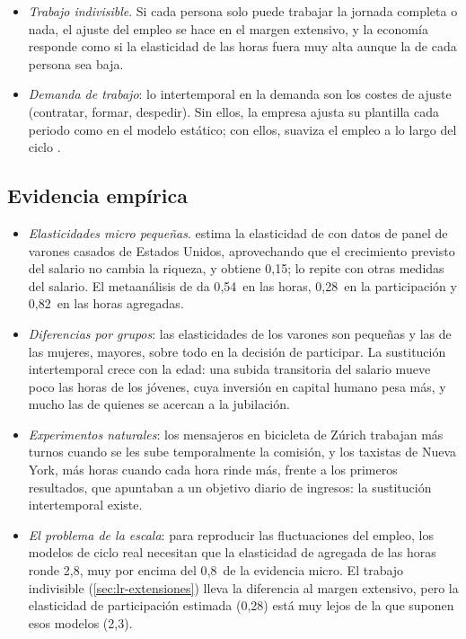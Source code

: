 \documentclass[11pt]{article}
\begin{document}
\begin{itemize}
\begin{itemize}
  \end{itemize}
\item \emph{Trabajo indivisible}. Si cada persona solo puede trabajar la jornada completa o nada, el ajuste del empleo se hace en el margen extensivo, y la economía responde como si la elasticidad de las horas fuera muy alta aunque la de cada persona sea baja\nocite{Hansen1985Indivisible,Rogerson1988Indivisible}.
\item \emph{Demanda de trabajo}: lo intertemporal en la demanda son los costes de ajuste (contratar, formar, despedir). Sin ellos, la empresa ajusta su plantilla cada periodo como en el modelo estático; con ellos, suaviza el empleo a lo largo del ciclo .
\end{itemize}

\subsection{Evidencia empírica}\label{sec:lr-evidencia}

\begin{itemize}
\item \emph{Elasticidades micro pequeñas}. \textcite{MaCurdy1981Empirical} estima la elasticidad de  con datos de panel de varones casados de Estados Unidos, aprovechando que el crecimiento previsto del salario no cambia la riqueza, y obtiene 0{,}15; \textcite{Altonji1986Intertemporal} lo repite con otras medidas del salario. El metaanálisis de \textcite{Chetty2011Micro} da 0{,}54~en las horas, 0{,}28~en la participación y 0{,}82~en las horas agregadas.
\item \emph{Diferencias por grupos}: las elasticidades de los varones son pequeñas y las de las mujeres, mayores, sobre todo en la decisión de participar\nocite{Keane2011Labor}. La sustitución intertemporal crece con la edad: una subida transitoria del salario mueve poco las horas de los jóvenes, cuya inversión en capital humano pesa más, y mucho las de quienes se acercan a la jubilación\nocite{ImaiKeane2004Intertemporal,French2005Effects}.
\item \emph{Experimentos naturales}: los mensajeros en bicicleta de Zúrich trabajan más turnos cuando se les sube temporalmente la comisión\nocite{FehrGoette2007Do}, y los taxistas de Nueva York, más horas cuando cada hora rinde más\nocite{Farber2015Why}, frente a los primeros resultados, que apuntaban a un objetivo diario de ingresos\nocite{CamererEtAl1997Labor}: la sustitución intertemporal existe.
\item \emph{El problema de la escala}: para reproducir las fluctuaciones del empleo, los modelos de ciclo real necesitan que la elasticidad de  agregada de las horas ronde 2{,}8, muy por encima del 0{,}8~de la evidencia micro\nocite{Chetty2011Micro}. El trabajo indivisible (\ref{sec:lr-extensiones}) lleva la diferencia al margen extensivo, pero la elasticidad de participación estimada (0{,}28) está muy lejos de la que suponen esos modelos (2{,}3)\nocite{Chetty2011Micro}.
\end{itemize}
\end{document}
